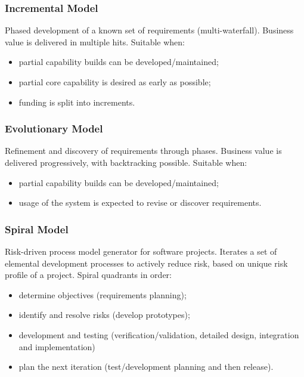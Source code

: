 \documentclass[journal]{IEEEtran}
\begin{document}
\subsubsection{Incremental Model}
Phased development of a known set of requirements (multi-waterfall). Business value is delivered in multiple hits. Suitable when:
\begin{itemize}
	\item partial capability builds can be developed/maintained;
	\item partial core capability is desired as early as possible;
	\item funding is split into increments.
\end{itemize}
\subsubsection{Evolutionary Model}
Refinement and discovery of requirements through phases. Business value is delivered progressively, with backtracking possible. Suitable when:
\begin{itemize}
	\item partial capability builds can be developed/maintained;
	\item usage of the system is expected to revise or discover requirements.
\end{itemize}
\subsubsection{Spiral Model}
Risk-driven process model generator for software projects. Iterates a set of elemental development processes to actively reduce risk, based on unique risk profile of a project. Spiral quadrants in order:
\begin{itemize}
	\item determine objectives (requirements planning);
	\item identify and resolve risks (develop prototypes);
	\item development and testing (verification/validation, detailed design, integration and implementation)
	\item plan the next iteration (test/development planning and then release).
\end{itemize}
\end{document}

